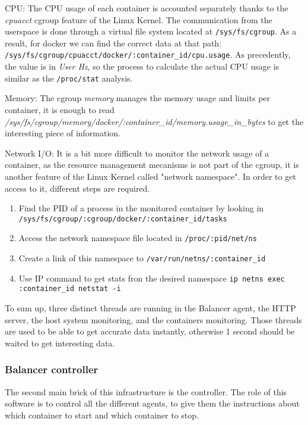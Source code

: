 \begin{itemize}
\item{CPU: The CPU usage of each container is accounted separately thanks to
the \textit{cpuacct} cgroup feature of the Linux Kernel. The communication
from the userspace is done through a virtual file system located at
\texttt{/sys/fs/cgroup}. As a result, for docker we can find the correct data
at that path: \newline\texttt{/sys/fs/cgroup/cpuacct/docker/:container\_id/cpu.usage}.
As precedently, the value is in \textit{User Hz}, so the process to calculate the
actual CPU usage is similar as the \texttt{/proc/stat} analysis.
\item{Memory: The cgroup \textit{memory} manages the memory usage and limits per
container, it is enough to read
\textit{/sys/fs/cgroup/memory/docker/:container\_id/memory.usage\_in\_bytes} to get
the interesting piece of information.}}
\item{Network I/O: It is a bit more difficult to monitor the network usage of a container,
as the resource management mecanisms is not part of the cgroup, it is another feature
of the Linux Kernel called "network namespace". In order to get access to it, different
steps are required.
\begin{enumerate}
\item{Find the PID of a process in the monitored container by looking in \texttt{/sys/fs/cgroup/:cgroup/docker/:container\_id/tasks}}
\item{Access the network namespace file located in \texttt{/proc/:pid/net/ns}}
\item{Create a link of this namespace to \texttt{/var/run/netns/:container\_id}}
\item{Use IP command to get stats fron the desired namespace \texttt{ip netns exec :container\_id netstat -i}}
\end{enumerate}}
\end{itemize}

To sum up, three distinct threads are running in the Balancer agent, the HTTP server,
the host system monitoring, and the containers monitoring. Those threads are used to
be able to get accurate data instantly, otherwise 1 second should be waited to get
interesting data.

\subsubsection{Balancer controller}

The second main brick of this infrastructure is the controller. The role of this software
is to control all the different agents, to give them the instructions about which container
to start and which container to stop.

